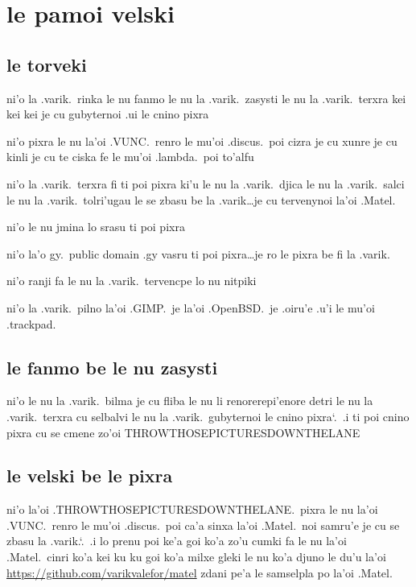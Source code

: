 \documentclass{report}
\newcommand\sds{\spacefactor\sfcode`.\ \space}
\begin{document}
\section{le pamoi velski}
\subsection{le torveki}
ni'o la .varik.\ rinka le nu fanmo le nu la .varik.\ zasysti le nu la .varik.\ terxra kei kei kei je cu gubyternoi .ui le cnino pixra

ni'o pixra le nu la'oi .VUNC.\ renro le mu'oi .discus.\ poi cizra je cu xunre je cu kinli je cu te ciska fe le mu'oi .lambda.\ poi to'alfu

ni'o la .varik.\ terxra fi ti poi pixra ki'u le nu la .varik.\ djica le nu la .varik.\ salci le nu la .varik.\ tolri'ugau le se zbasu be la .varik\ldots je cu tervenynoi la'oi .Matel.

ni'o le nu jmina lo srasu ti poi pixra

ni'o la'o gy.\ public domain .gy vasru ti poi pixra\ldots je ro le pixra be fi la .varik.

ni'o ranji fa le nu la .varik.\ tervencpe lo nu nitpiki

ni'o la .varik.\ pilno la'oi .GIMP.\ je la'oi .OpenBSD.\ je .oiru'e .u'i le mu'oi .trackpad.

\subsection{le fanmo be le nu zasysti}
ni'o le nu la .varik.\ bilma je cu fliba le nu li renorerepi'enore detri le nu la .varik.\ terxra cu selbalvi le nu la .varik.\ gubyternoi le cnino pixra\sds  .i ti poi cnino pixra cu se cmene zo'oi THROWTHOSEPICTURESDOWNTHELANE

\subsection{le velski be le pixra}
ni'o la'oi .THROWTHOSEPICTURESDOWNTHELANE.\ pixra le nu la'oi \linebreak  %
.VUNC.\ renro le mu'oi .discus.\ poi ca'a sinxa la'oi .Matel.\ noi samru'e je cu se zbasu la .varik.\sds  .i lo prenu poi ke'a goi ko'a zo'u cumki fa le nu la'oi .Matel.\ cinri ko'a kei ku ku goi ko'a milxe gleki le nu ko'a djuno le du'u la'oi \url{https://github.com/varikvalefor/matel} zdani pe'a le samselpla po la'oi .Matel.
\end{document}

